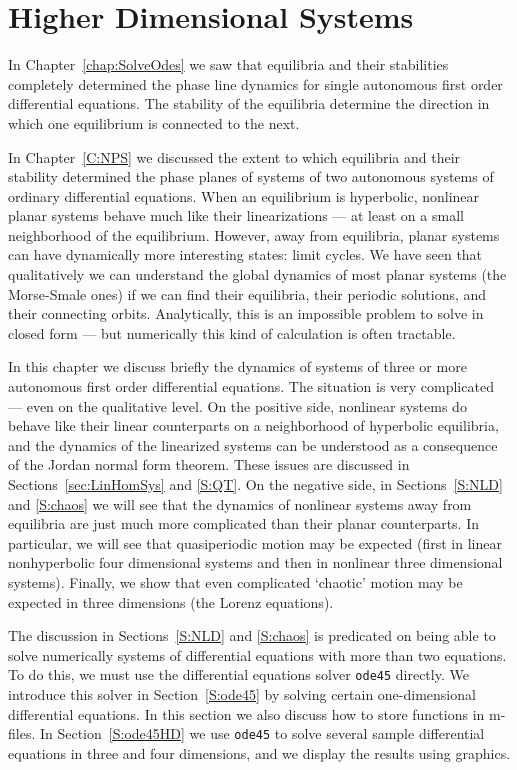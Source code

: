 \chapter{Higher Dimensional Systems}
\label{C:HDS}

\normalsize

In Chapter~\ref{chap:SolveOdes} we saw that equilibria and their 
stabilities completely determined the phase line dynamics for single
autonomous first order differential equations.  The stability of the
equilibria determine the direction in which one equilibrium is connected 
to the next.

In Chapter~\ref{C:NPS} we discussed the extent to which equilibria and 
their stability determined the phase planes of systems of two autonomous 
systems of ordinary differential equations.  When an equilibrium is 
hyperbolic, nonlinear planar systems behave much like their linearizations 
--- at least on a small neighborhood of the equilibrium.  However, away 
from equilibria, planar systems can have dynamically more interesting 
states: limit cycles.  We have seen that qualitatively we can understand the
global dynamics of most planar systems (the Morse-Smale ones) if we can find 
their equilibria, their periodic
solutions, and their connecting orbits.  Analytically, this is an impossible
problem to solve in closed form --- but numerically this kind of calculation
is often tractable.

In this chapter we discuss briefly the dynamics of systems of three or
more autonomous first order differential equations.  The situation is
very complicated --- even on the qualitative level.  On the positive
side, nonlinear systems do behave like their linear counterparts on a
neighborhood of hyperbolic equilibria, and the dynamics of the linearized
systems can be understood as a consequence of the Jordan normal form theorem.
These issues are discussed in Sections~\ref{sec:LinHomSys} and \ref{S:QT}.  
On the negative side, in Sections~\ref{S:NLD} and \ref{S:chaos} we will see 
that the dynamics of nonlinear systems away from equilibria are just much 
more complicated than their planar counterparts.  In particular, we will see 
that quasiperiodic motion may be expected (first in linear nonhyperbolic four 
dimensional systems and then in nonlinear three dimensional systems).  
Finally, we show that even complicated `chaotic' motion may be expected in 
three dimensions (the Lorenz equations). 

The discussion in Sections~\ref{S:NLD} and \ref{S:chaos} is predicated on 
being able to solve numerically systems of differential equations with more 
than two equations.  To do this, we must use the \Matlab differential 
equations solver {\tt ode45} directly.  We introduce this solver in 
Section~\ref{S:ode45} by solving certain one-dimensional differential 
equations.  In this section we also discuss how to store functions in \Matlab 
m-files.  In Section~\ref{S:ode45HD} we use {\tt ode45} to solve several 
sample differential equations in three and four dimensions, and we display 
the results using \Matlab graphics. 

